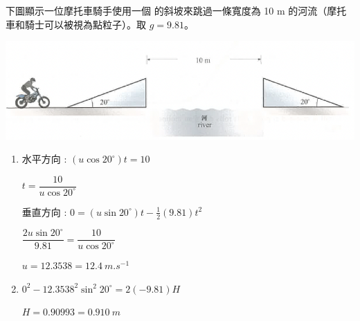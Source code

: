 {
下圖顯示一位摩托車騎手使用一個 的斜坡來跳過一條寬度為 10 m 的河流（摩托車和騎士可以被視為點粒子）。取 $g=9.81$。
{\par\centering
\includegraphics[width=.7\textwidth]{assets/607732e8.png}
\par}
}{
\sol
\begin{enumerate}
    \item 水平方向 : $(u\cos 20^\circ)t=10$ \par
          $t=\dfrac{10}{u\cos 20^\circ}$\giveM\par
          垂直方向 : $0=(u\sin 20^\circ)t-\frac{1}{2}(9.81)t^2$\par
          $\dfrac{2u\sin 20^\circ}{9.81}=\dfrac{10}{u\cos 20^\circ}$\par
          $u=12.3538=\qty{12.4}{m.s^{-1}}$ \giveA
    \item $0^2-12.3538^2\sin^2 20^\circ=2(-9.81)H$\giveM\par
          $H=0.90993=\qty{0.910}{m}$\giveA
\end{enumerate}
}


